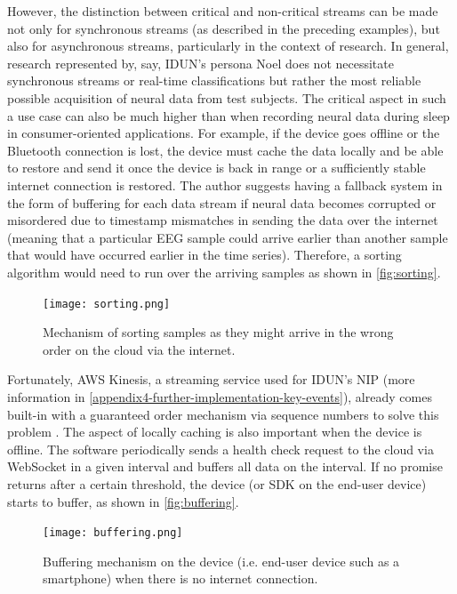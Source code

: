 However, the distinction between critical and non-critical streams can be made not only for synchronous streams (as described in the preceding examples), but also for asynchronous streams, particularly in the context of research. In general, research represented by, say, IDUN’s persona Noel does not necessitate synchronous streams or real-time classifications but rather the most reliable possible acquisition of neural data from test subjects. The critical aspect in such a use case can also be much higher than when recording neural data during sleep in consumer-oriented applications. For example, if the device goes offline or the Bluetooth connection is lost, the device must cache the data locally and be able to restore and send it once the device is back in range or a sufficiently stable internet connection is restored. The author suggests having a fallback system in the form of buffering for each data stream if neural data becomes corrupted or misordered due to timestamp mismatches in sending the data over the internet (meaning that a particular EEG sample could arrive earlier than another sample that would have occurred earlier in the time series). Therefore, a sorting algorithm would need to run over the arriving samples as shown in \autoref{fig:sorting}.

\begin{figure}[!ht]
  \centering
  \texttt{[image: sorting.png]}
  \caption{Mechanism of sorting samples as they might arrive in the wrong order on the cloud via the internet.}
  \label{fig:sorting}
\end{figure}

Fortunately, AWS Kinesis, a streaming service used for IDUN's NIP (more information in \autoref{appendix4-further-implementation-key-events}), already comes built-in with a guaranteed order mechanism via sequence numbers to solve this problem \citep{amazon_web_services_inc_amazon_nodate}. The aspect of locally caching is also important when the device is offline. The software periodically sends a health check request to the cloud via WebSocket in a given interval and buffers all data on the interval. If no promise returns after a certain threshold, the device (or SDK on the end-user device) starts to buffer, as shown in \autoref{fig:buffering}.

\begin{figure}[!ht]
  \centering
  \texttt{[image: buffering.png]}
  \caption{Buffering mechanism on the device (i.e. end-user device such as a smartphone) when there is no internet connection.}
  \label{fig:buffering}
\end{figure}

